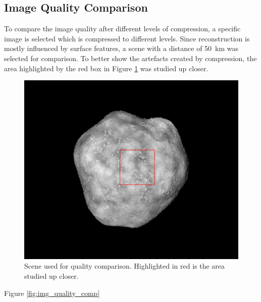 \subsection{Image Quality Comparison}
To compare the image quality after different levels of compression, a specific image is selected which is compressed to different levels. Since reconstruction is mostly influenced by surface features, a scene with a distance of \SI{50}{\kilo\meter} was selected for comparison. To better show the artefacts created by compression, the area highlighted by the red box in Figure \ref{fig:img_quality_frame} was studied up closer.

\begin{figure}[htb]
    \begin{center}
        \includegraphics[width=\textwidth]{doc/thesis/0_figures/quality_compare/jp2_1000_frame.png}
    \end{center}
    \caption{Scene used for quality comparison. Highlighted in red is the area studied up closer.}
    \label{fig:img_quality_frame}
\end{figure}

Figure \ref{fig:img_quality_comp}

